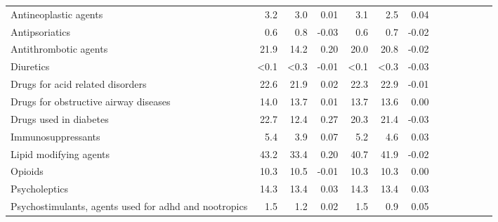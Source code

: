 \documentclass[11pt,]{article}
\begin{document}
\begin{longtable}{lrrrrrrrrrrrr}
      Antineoplastic agents &  3.2 &  3.0 &  0.01 &  3.1 &  2.5 &  0.04 \\ 
      Antipsoriatics &  0.6 &  0.8 & -0.03 &  0.6 &  0.7 & -0.02 \\ 
      Antithrombotic agents & 21.9 & 14.2 &  0.20 & 20.0 & 20.8 & -0.02 \\ 
      Diuretics & <0.1 & <0.3 & -0.01 & <0.1 & <0.3 & -0.03 \\ 
      Drugs for acid related disorders & 22.6 & 21.9 &  0.02 & 22.3 & 22.9 & -0.01 \\ 
      Drugs for obstructive airway diseases & 14.0 & 13.7 &  0.01 & 13.7 & 13.6 &  0.00 \\ 
      Drugs used in diabetes & 22.7 & 12.4 &  0.27 & 20.3 & 21.4 & -0.03 \\ 
      Immunosuppressants &  5.4 &  3.9 &  0.07 &  5.2 &  4.6 &  0.03 \\ 
      Lipid modifying agents & 43.2 & 33.4 &  0.20 & 40.7 & 41.9 & -0.02 \\ 
      Opioids & 10.3 & 10.5 & -0.01 & 10.3 & 10.3 &  0.00 \\ 
      Psycholeptics & 14.3 & 13.4 &  0.03 & 14.3 & 13.4 &  0.03 \\ 
      Psychostimulants, agents used for adhd and nootropics &  1.5 &  1.2 &  0.02 &  1.5 &  0.9 &  0.05 \\ 
   \bottomrule\end{longtable}
\clearpage
{}
\end{document}
